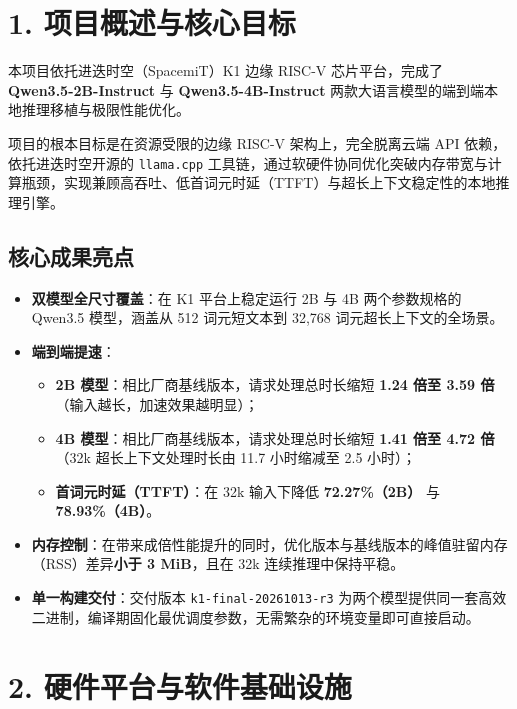 \documentclass[10pt,a4paper,fontset=none]{ctexart}
\begin{document}
{\small\tableofcontents}
\clearpage

\section{1. 项目概述与核心目标}

本项目依托进迭时空（SpacemiT）K1 边缘 RISC-V 芯片平台，完成了 \textbf{Qwen3.5-2B-Instruct} 与 \textbf{Qwen3.5-4B-Instruct} 两款大语言模型的端到端本地推理移植与极限性能优化。

项目的根本目标是在资源受限的边缘 RISC-V 架构上，完全脱离云端 API 依赖，依托进迭时空开源的 \texttt{llama.cpp} 工具链，通过软硬件协同优化突破内存带宽与计算瓶颈，实现兼顾高吞吐、低首词元时延（TTFT）与超长上下文稳定性的本地推理引擎。

\subsection{核心成果亮点}
\begin{itemize}
  \item \textbf{双模型全尺寸覆盖}：在 K1 平台上稳定运行 2B 与 4B 两个参数规格的 Qwen3.5 模型，涵盖从 512 词元短文本到 32,768 词元超长上下文的全场景。
  \item \textbf{端到端提速}：
  \begin{itemize}
    \item \textbf{2B 模型}：相比厂商基线版本，请求处理总时长缩短 \textbf{1.24 倍至 3.59 倍}（输入越长，加速效果越明显）；
    \item \textbf{4B 模型}：相比厂商基线版本，请求处理总时长缩短 \textbf{1.41 倍至 4.72 倍}（32k 超长上下文处理时长由 11.7 小时缩减至 2.5 小时）；
    \item \textbf{首词元时延（TTFT）}：在 32k 输入下降低 \textbf{72.27\%（2B）} 与 \textbf{78.93\%（4B）}。
  \end{itemize}
  \item \textbf{内存控制}：在带来成倍性能提升的同时，优化版本与基线版本的峰值驻留内存（RSS）差异\textbf{小于 3 MiB}，且在 32k 连续推理中保持平稳。
  \item \textbf{单一构建交付}：交付版本 \texttt{k1-final-20261013-r3} 为两个模型提供同一套高效二进制，编译期固化最优调度参数，无需繁杂的环境变量即可直接启动。
\end{itemize}

\section{2. 硬件平台与软件基础设施}
\end{document}
